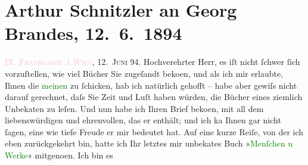 

               \section[Arthur Schnitzler an Georg Brandes, 12. 6. 1894]{ Arthur Schnitzler an Georg Brandes, 12. 6. 1894}\nopagebreak{}\rehead{ }\normalsize\beginnumbering{} \toendnotes[C]{\smallbreak\pagebreak[2]} 
\toendnotes[C]{\smallbreak}\pstart
           \raggedleft{}{\pb}\textcolor{pink}{\textsc{IX.
                            Frankgasse 1.}}{}\ledrightnote{\textcolor{pink}{Frankgasse}}{\\}\textsc{\textcolor{pink}{Wien}{}\ledrightnote{\textcolor{pink}{Wien}}, 12. Juni
                                94.}\pend
           \pstart\center{}Hochverehrter Herr,\pend\pstart
           es iſt nicht ſchwer ſich vorzuſtellen, wie viel Bücher Sie zugeſandt beko{\geminationm}en, und als ich mir erlaubte, Ihnen die \textcolor{green}{meinen}{} zu ſchicken, hab ich
                    natürlich gehofft – habe aber gewiſs nicht darauf gerechnet, daſs Sie Zeit und
                    Luſt haben würden, die Bücher eines ziemlich Unbeka{\geminationn}ten zu leſen. Und nun habe ich Ihren Brief beko{\geminationm}en, mit all dem liebens{\pb}würdigen und
                    ehrenvollen, das er enthält; und ich ka{\geminationn} Ihnen gar
                    nicht ſagen, eine wie tiefe Freude er mir bedeutet hat. Auf eine kurze Reiſe,
                    von der ich eben zurückgekehrt bin, hatte ich Ihr letztes mir unbeka{\geminationn}tes Buch »\textcolor{green}{Menſchen u
                        Werke}{}\ledrightnote{\textcolor{green}{Menschen und Werke}}« mitgeno{\geminationm}en. Ich bin es
